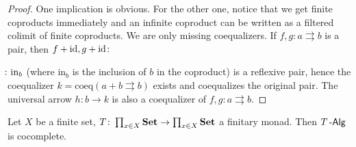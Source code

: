 \documentclass[a4paper,11pt,oneside,openany]{scrbook}
\begin{document}
\begin{proof}
	One implication is obvious. For the other one, notice that we get finite coproducts immediately and an infinite coproduct can be written as a filtered colimit of finite coproducts. We are only missing coequalizers. If $f,g\colon a\rightrightarrows b$ is a pair, then $f+\operatorname{id},g+\operatorname{id}\colon\hspace{-1.5mm}$$\hspace{-1.5mm}\colon\text{in}_b$ (where in$_b$ is the
	inclusion of $b$ in the coproduct) is a reflexive pair, hence the
	coequalizer $k=\text{coeq}(a+b\rightrightarrows b)$ exists and coequalizes
	the original pair. The universal arrow $h\colon b\rightarrow k$ is also a
	coequalizer of $f,g\colon a\rightrightarrows b$.
\end{proof}
\begin{thm}
	Let $X$ be a finite set, $T\colon\prod_{x\in X}{\normalfont\textbf{Set}}\to\prod_{x\in X}{\normalfont\textbf{Set}}$ a finitary monad. Then $T\operatorname{-\mathsf{Alg}}$ is cocomplete.
\end{thm}
\end{document}
